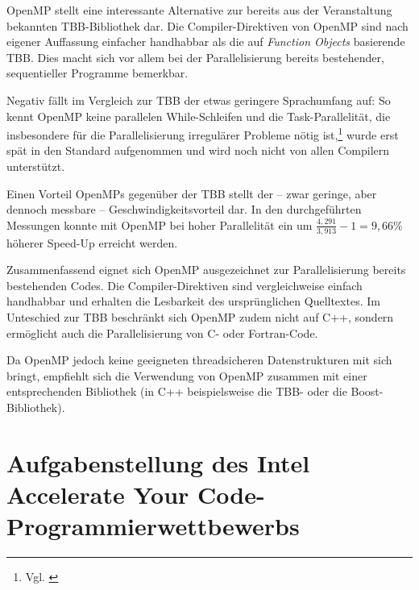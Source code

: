 \documentclass[11pt]{scrartcl}
\begin{document}
OpenMP stellt eine interessante Alternative zur bereits aus der Veranstaltung bekannten TBB-Bibliothek dar. Die
Compiler-Direktiven von OpenMP sind nach eigener Auffassung einfacher handhabbar als die auf \emph{Function Objects}
basierende TBB. Dies macht sich vor allem bei der Parallelisierung bereits bestehender, sequentieller Programme
bemerkbar.

Negativ fällt im Vergleich zur TBB der etwas geringere Sprachumfang auf: So kennt OpenMP keine parallelen
While-Schleifen und die Task-Parallelität, die insbesondere für die Parallelisierung irregulärer Probleme nötig
ist,\footnote{Vgl. \cite[S.~6]{duran_tasking_2009}} wurde erst spät in den Standard aufgenommen und wird noch nicht von
allen Compilern unterstützt.

Einen Vorteil OpenMPs gegenüber der TBB stellt der -- zwar geringe, aber dennoch messbare -- Geschwindigkeitsvorteil
dar. In den durchgeführten Messungen konnte mit OpenMP bei hoher Parallelität ein um $\frac{4,291}{3,913}-1 =
9,66\%$ höherer Speed-Up erreicht werden.

Zusammenfassend eignet sich OpenMP ausgezeichnet zur Parallelisierung bereits besteh\-enden Codes. Die
Compiler-Direktiven sind vergleichweise einfach handhabbar und erhalten die Lesbarkeit des ursprünglichen Quelltextes.
Im Unteschied zur TBB beschränkt sich OpenMP zudem nicht auf C++, sondern ermöglicht auch die Parallelisierung von C-
oder Fortran-Code.

Da OpenMP jedoch keine geeigneten threadsicheren Datenstrukturen mit sich bringt, empfiehlt sich die
Verwendung von OpenMP zusammen mit einer entsprechenden Bibliothek (in C++ beispielsweise die TBB- oder die Boost-Bibliothek).

\pagebreak %

\fancyhead[R]{}

\thispagestyle{empty}
\listoffigures

\listoftables

\lstlistoflistings

\renewcommand*{\biburlprefix}{(URL: }
\renewcommand*{\biburlsuffix}{)}

\pagebreak
{} %


\appendix

\section{Aufgabenstellung des Intel Accelerate Your Code-Programmierwettbewerbs}
\end{document}
